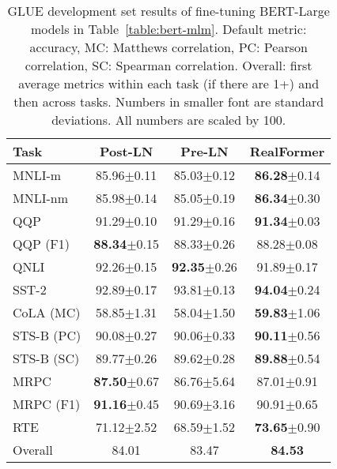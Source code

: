 \documentclass[11pt,a4paper]{article}
\begin{document}
\begin{table}[t]
\setlength{\tabcolsep}{3.5pt}
\centering
\begin{tabular}{l|ccc}
\hline 
\textbf{Task}      & \textbf{Post-LN}     & \textbf{Pre-LN}       & \textbf{RealFormer}      \\ \hline
MNLI-m             & 85.96\tiny{$\pm$0.11}  & 85.03\tiny{$\pm$0.12}   & \textbf{86.28}\tiny{$\pm$0.14}  \\
MNLI-nm            & 85.98\tiny{$\pm$0.14}  & 85.05\tiny{$\pm$0.19}   & \textbf{86.34}\tiny{$\pm$0.30}  \\
QQP                & 91.29\tiny{$\pm$0.10}  & 91.29\tiny{$\pm$0.16}   & \textbf{91.34}\tiny{$\pm$0.03}  \\
QQP \small{(F1)}   & \textbf{88.34}\tiny{$\pm$0.15}  & 88.33\tiny{$\pm$0.26}   & 88.28\tiny{$\pm$0.08}  \\
QNLI               & 92.26\tiny{$\pm$0.15}  & \textbf{92.35}\tiny{$\pm$0.26}   & 91.89\tiny{$\pm$0.17}  \\
SST-2              & 92.89\tiny{$\pm$0.17}  & 93.81\tiny{$\pm$0.13}   & \textbf{94.04}\tiny{$\pm$0.24}  \\
CoLA \small{(MC)}  & 58.85\tiny{$\pm$1.31}  & 58.04\tiny{$\pm$1.50}   & \textbf{59.83}\tiny{$\pm$1.06}  \\
STS-B \small{(PC)} & 90.08\tiny{$\pm$0.27}  & 90.06\tiny{$\pm$0.33}   & \textbf{90.11}\tiny{$\pm$0.56}  \\
STS-B \small{(SC)} & 89.77\tiny{$\pm$0.26}  & 89.62\tiny{$\pm$0.28}   & \textbf{89.88}\tiny{$\pm$0.54}  \\
MRPC               & \textbf{87.50}\tiny{$\pm$0.67}  & 86.76\tiny{$\pm$5.64}   & 87.01\tiny{$\pm$0.91}  \\
MRPC \small{(F1)}  & \textbf{91.16}\tiny{$\pm$0.45}  & 90.69\tiny{$\pm$3.16}   & 90.91\tiny{$\pm$0.65}  \\
RTE                & 71.12\tiny{$\pm$2.52}  & 68.59\tiny{$\pm$1.52}   & \textbf{73.65}\tiny{$\pm$0.90}  \\ \hline
Overall            & 84.01                  & 83.47                   & \textbf{84.53}  \\
\hline
\end{tabular}
\caption{\label{table:glue} GLUE development set results of fine-tuning BERT-Large models in Table~\ref{table:bert-mlm}. Default metric: accuracy, MC: Matthews correlation, PC: Pearson correlation, SC: Spearman correlation. Overall: first average metrics within each task (if there are 1+) and then across tasks. Numbers in smaller font are standard deviations. All numbers are scaled by 100.}
\end{table}
 
\end{document}
